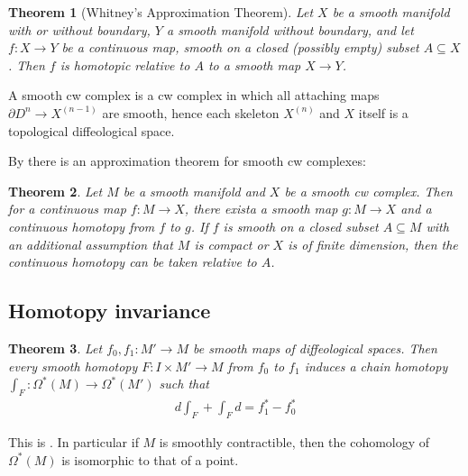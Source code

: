 \documentclass{scrartcl}
\theoremstyle{plain}
\newtheorem{theorem}{Theorem}[section]
\theoremstyle{definition}
\renewcommand{\subset}{\subseteq}
\begin{document}
\begin{theorem}[Whitney's Approximation Theorem]
    Let $X$ be a smooth manifold with or without boundary, $Y$ a smooth manifold without boundary, and let $f\colon X\to Y$ be a continuous map, smooth on a closed (possibly empty) subset $A\subset X$. Then $f$ is homotopic relative to $A$ to a smooth map $X\to Y$.
\end{theorem}

A smooth cw complex is a cw complex in which all attaching maps $\partial D^n\to X^{(n-1)}$ are smooth, hence each skeleton $X^{(n)}$ and $X$ itself is a topological diffeological space.

By \cite{iwase2020whitney} there is an approximation theorem for smooth cw complexes:
\begin{theorem}
    Let $M$ be a smooth manifold and $X$ be a smooth cw complex. Then for a continuous map $f\colon M\to X$, there exista a smooth map $g\colon M\to X$ and a continuous homotopy from $f$ to $g$. If $f$ is smooth on a closed subset $A\subset M$ with an additional assumption that $M$ is compact or $X$ is of finite dimension, then the continuous homotopy can be taken relative to $A$. 
\end{theorem}

\subsection{Homotopy invariance}
\begin{theorem}
    Let $f_0, f_1\colon M'\to M$ be smooth maps of diffeological spaces. Then every smooth homotopy $F\colon I\times M'\to M$ from $f_0$ to $f_1$ induces a chain homotopy $\int_F\colon \Omega^*(M)\to \Omega^*(M')$ such that 
    \begin{align*}
        d\int_F + \int_F d = f_1^* - f_0^*
    \end{align*}
\end{theorem}
This is \cite[Lemma 1.4.1]{chen1977iterated}. In particular if $M$ is smoothly contractible, then the cohomology of $\Omega^*(M)$ is isomorphic to that of a point.

\end{document}
